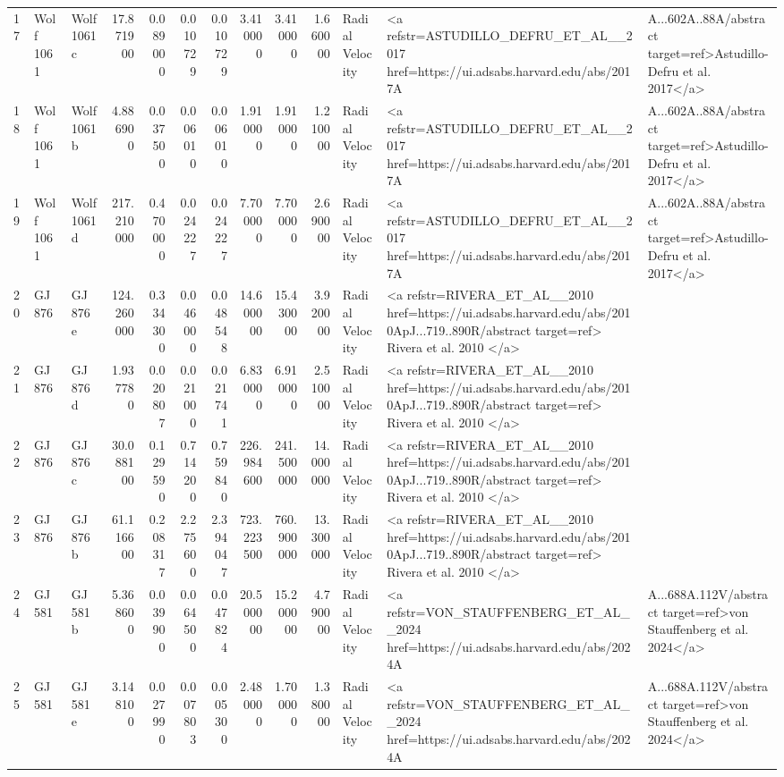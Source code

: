 \begin{tabular}{lllrrrrrrrll}
17 & Wolf 1061 & Wolf 1061 c & 17.871900 & 0.089000 & 0.010729 & 0.010729 & 3.410000 & 3.410000 & 1.660000 & Radial Velocity & <a refstr=ASTUDILLO_DEFRU_ET_AL__2017 href=https://ui.adsabs.harvard.edu/abs/2017A&A...602A..88A/abstract target=ref>Astudillo-Defru et al. 2017</a> \\
18 & Wolf 1061 & Wolf 1061 b & 4.886900 & 0.037500 & 0.006010 & 0.006010 & 1.910000 & 1.910000 & 1.210000 & Radial Velocity & <a refstr=ASTUDILLO_DEFRU_ET_AL__2017 href=https://ui.adsabs.harvard.edu/abs/2017A&A...602A..88A/abstract target=ref>Astudillo-Defru et al. 2017</a> \\
19 & Wolf 1061 & Wolf 1061 d & 217.210000 & 0.470000 & 0.024227 & 0.024227 & 7.700000 & 7.700000 & 2.690000 & Radial Velocity & <a refstr=ASTUDILLO_DEFRU_ET_AL__2017 href=https://ui.adsabs.harvard.edu/abs/2017A&A...602A..88A/abstract target=ref>Astudillo-Defru et al. 2017</a> \\
20 & GJ 876 & GJ 876 e & 124.260000 & 0.334300 & 0.046000 & 0.048548 & 14.600000 & 15.430000 & 3.920000 & Radial Velocity & <a refstr=RIVERA_ET_AL__2010 href=https://ui.adsabs.harvard.edu/abs/2010ApJ...719..890R/abstract target=ref> Rivera et al. 2010 </a> \\
21 & GJ 876 & GJ 876 d & 1.937780 & 0.020807 & 0.021000 & 0.021741 & 6.830000 & 6.910000 & 2.510000 & Radial Velocity & <a refstr=RIVERA_ET_AL__2010 href=https://ui.adsabs.harvard.edu/abs/2010ApJ...719..890R/abstract target=ref> Rivera et al. 2010 </a> \\
22 & GJ 876 & GJ 876 c & 30.088100 & 0.129590 & 0.714200 & 0.759840 & 226.984600 & 241.500000 & 14.000000 & Radial Velocity & <a refstr=RIVERA_ET_AL__2010 href=https://ui.adsabs.harvard.edu/abs/2010ApJ...719..890R/abstract target=ref> Rivera et al. 2010 </a> \\
23 & GJ 876 & GJ 876 b & 61.116600 & 0.208317 & 2.275600 & 2.394047 & 723.223500 & 760.900000 & 13.300000 & Radial Velocity & <a refstr=RIVERA_ET_AL__2010 href=https://ui.adsabs.harvard.edu/abs/2010ApJ...719..890R/abstract target=ref> Rivera et al. 2010 </a> \\
24 & GJ 581 & GJ 581 b & 5.368600 & 0.039900 & 0.064500 & 0.047824 & 20.500000 & 15.200000 & 4.790000 & Radial Velocity & <a refstr=VON_STAUFFENBERG_ET_AL__2024 href=https://ui.adsabs.harvard.edu/abs/2024A&A...688A.112V/abstract target=ref>von Stauffenberg et al. 2024</a> \\
25 & GJ 581 & GJ 581 e & 3.148100 & 0.027990 & 0.007803 & 0.005300 & 2.480000 & 1.700000 & 1.380000 & Radial Velocity & <a refstr=VON_STAUFFENBERG_ET_AL__2024 href=https://ui.adsabs.harvard.edu/abs/2024A&A...688A.112V/abstract target=ref>von Stauffenberg et al. 2024</a> \\

\end{tabular}

